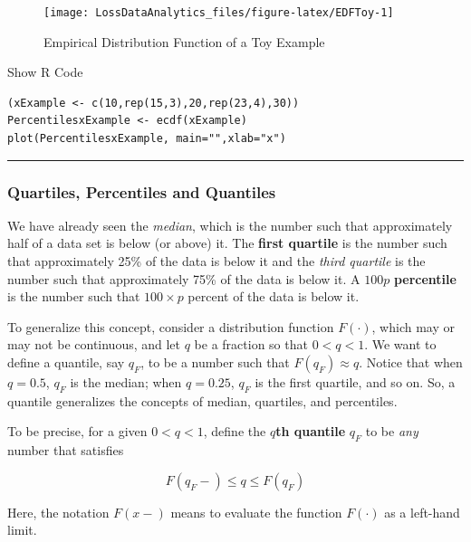 \documentclass[]{book}
\theoremstyle{definition}
\theoremstyle{definition}
\theoremstyle{definition}
\theoremstyle{remark}
\begin{document}
\begin{figure}

{\centering \texttt{[image: LossDataAnalytics\_files/figure-latex/EDFToy-1]} 

}

\caption{Empirical Distribution Function of a Toy Example}\label{fig:EDFToy}
\end{figure}

Show R Code

\hypertarget{toggleToy}{}
\begin{verbatim}
(xExample <- c(10,rep(15,3),20,rep(23,4),30))
PercentilesxExample <- ecdf(xExample)
plot(PercentilesxExample, main="",xlab="x")
\end{verbatim}

\begin{center}\rule{0.5\linewidth}{\linethickness}\end{center}

\subsubsection{Quartiles, Percentiles and
Quantiles}\label{S:MS:QuantileEstimator}

We have already seen the \emph{median}, which is the number such that
approximately half of a data set is below (or above) it. The
\textbf{first quartile} is the number such that approximately 25\% of
the data is below it and the \emph{third quartile} is the number such
that approximately 75\% of the data is below it. A \(100p\)
\textbf{percentile} is the number such that \(100 \times p\) percent of
the data is below it.

To generalize this concept, consider a distribution function
\(F(\cdot)\), which may or may not be continuous, and let \(q\) be a
fraction so that \(0<q<1\). We want to define a quantile, say \(q_F\),
to be a number such that \(F(q_F) \approx q\). Notice that when
\(q = 0.5\), \(q_F\) is the median; when \(q = 0.25\), \(q_F\) is the
first quartile, and so on. So, a quantile generalizes the concepts of
median, quartiles, and percentiles.

To be precise, for a given \(0<q<1\), define the \(q\)\textbf{th
quantile} \(q_F\) to be \emph{any} number that satisfies

\begin{equation}
  F(q_F-) \le q \le F(q_F)
  \label{eq:Quantile}
\end{equation}

Here, the notation \(F(x-)\) means to evaluate the function \(F(\cdot)\)
as a left-hand limit.
\end{document}
